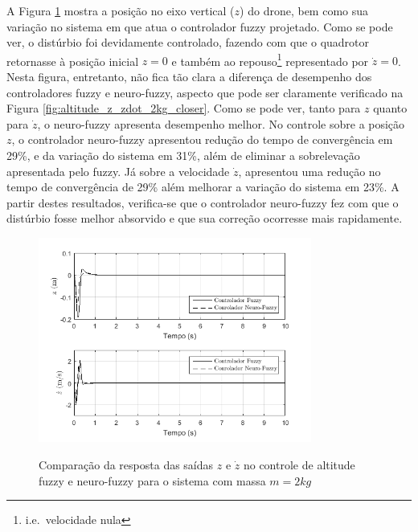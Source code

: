 A Figura \ref{fig:altitude_z_zdot_2kg} mostra a posição no eixo vertical ($z$) do drone, bem como sua variação no sistema em que atua o controlador fuzzy projetado. Como se pode ver, o distúrbio foi devidamente controlado, fazendo com que o quadrotor retornasse à posição inicial $z=0$ e também ao repouso\footnote{i.e.\ velocidade nula} representado por $\dot{z}=0$. Nesta figura, entretanto, não fica tão clara a diferença de desempenho dos controladores fuzzy e neuro-fuzzy, aspecto que pode ser claramente verificado na Figura \ref{fig:altitude_z_zdot_2kg_closer}. Como se pode ver, tanto para $z$ quanto para $\dot{z}$, o neuro-fuzzy apresenta desempenho melhor. No controle sobre a posição $z$, o controlador neuro-fuzzy apresentou redução do tempo de convergência em 29\%, e da variação do sistema em 31\%, além de eliminar a sobrelevação apresentada pelo fuzzy. Já sobre a velocidade $\dot{z}$, apresentou uma redução no tempo de convergência de 29\% além melhorar a variação do sistema em 23\%. A partir destes resultados, verifica-se que o controlador neuro-fuzzy fez com que o distúrbio fosse melhor absorvido e que sua correção ocorresse mais rapidamente.

\begin{figure}[!htb]
    \centering
    \caption{Comparação da resposta das saídas $z$ e $\dot{z}$ no controle de altitude fuzzy e neuro-fuzzy para o sistema com massa $m=2kg$}
    \includegraphics[width=0.8\textwidth]{./04-figuras/resultados/novos/altitude_z_zdot_2kg}
    \label{fig:altitude_z_zdot_2kg}
\end{figure}


